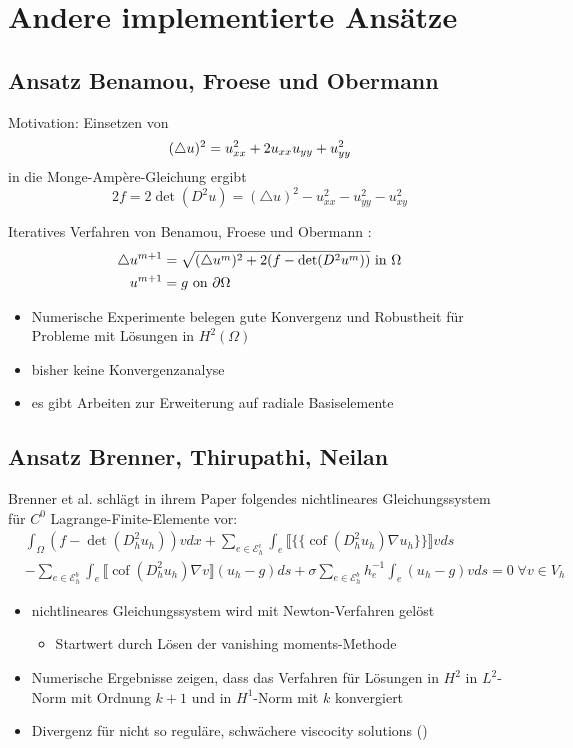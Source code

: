 \documentclass[a4paper,11pt]{article}
\newcommand{\cof}{\operatorname{cof}}
\newcommand{\bigEps}{\mathcal{E}}
\begin{document}
\section*{Andere implementierte Ansätze}

\subsection*{Ansatz Benamou, Froese und Obermann}
Motivation: Einsetzen von  
\[
	(\triangle u)^2= u_{xx}^2 + 2 u_{xx}u_{yy} + u_{yy}^2 \\
\]
in die Monge-Amp\`ere-Gleichung	ergibt
\[
	2f = 2\det(D^2u) = (\triangle u)^2  - u_{xx}^2  - u_{yy}^2  - u_{xy}^2  
\]

Iteratives Verfahren von Benamou, Froese und Obermann \cite{BFO2010}:
\begin{align*}
	\triangle u^{m+1} &= \sqrt{(\triangle{u^{m} })^2 +2 (f - \operatorname{det} (D^2u^m)) }\textnormal{ in } \Omega \\
	u^{m+1} &= g \textnormal{ on } \partial \Omega 
\end{align*}
\begin{itemize}
	\item Numerische Experimente belegen gute Konvergenz und Robustheit für Probleme mit Lösungen in $H^2(\Omega)$
	\item bisher keine Konvergenzanalyse
	\item es gibt Arbeiten zur Erweiterung auf radiale Basiselemente \cite{LH2013}
\end{itemize}

\subsection*{Ansatz Brenner, Thirupathi, Neilan}
Brenner et al. schlägt in ihrem Paper \cite{BGN+2011} folgendes nichtlineares Gleichungssystem für $C^0$ Lagrange-Finite-Elemente vor:
\begin{align*}
	&\int_\Omega \left(  f- \det(D^2_h u_h)   \right) v dx
	                     + \sum\limits_{e \in \bigEps_h^i} \int_e \llbracket \{\{\cof(D^2_h u_h) \nabla u_h\}\}  \rrbracket v ds \\
	                     &- \sum\limits_{e \in \bigEps_h^b} \int_e \llbracket \cof(D^2_h u_h) \nabla v \rrbracket (u_h - g) ds 
	                     + \sigma \sum\limits_{e \in \bigEps_h^b} h_e^{-1} \int_e (u_h - g) v ds = 0 \; \forall v \in V_h
\end{align*}

\begin{itemize}
	\item nichtlineares Gleichungssystem wird mit Newton-Verfahren gelöst
	\begin{itemize}
		\item Startwert durch Lösen der vanishing moments-Methode
	\end{itemize}
	\item Numerische Ergebnisse zeigen, dass das Verfahren für Lösungen in $H^2$ in $L^2$-Norm mit Ordnung $k+1$ und in $H^1$-Norm mit $k$ konvergiert
	\item  Divergenz für nicht so reguläre, schwächere viscocity solutions (\cite{FGN2013})
\end{itemize}
\end{document}
